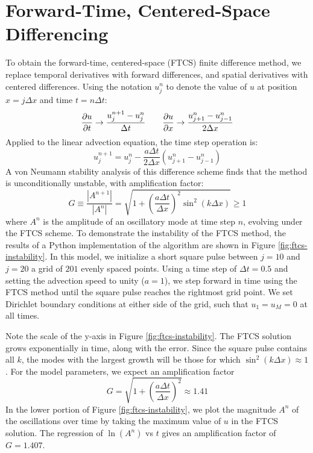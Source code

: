 \documentclass[%
 reprint,
 amsmath,amssymb,
 aps,
]{revtex4-2}
\begin{document}
\section{Forward-Time, Centered-Space Differencing}

To obtain the forward-time, centered-space (FTCS) finite difference method, we replace temporal derivatives with forward differences, and spatial derivatives with centered differences. Using the notation $u_j^n$ to denote the value of $u$ at position $x = j\Delta x$ and time $t = n\Delta t$:
\begin{equation}
\pdv{u}{t} \rightarrow \frac{u_j ^{n+1} - u_j ^n}{\Delta t} \qquad \pdv{u}{x} \rightarrow \frac{u_{j+1} ^n - u_{j-1} ^n}{2 \Delta x}
\end{equation}
Applied to the linear advection equation, the time step operation is:
\begin{equation}
u_j ^{n+1} = u_j ^n - \frac{a \Delta t}{2 \Delta x} \left(u_{j+1} ^n - u_{j-1} ^n\right)
\end{equation}
A von Neumann stability analysis of this difference scheme finds that the method is unconditionally unstable, with amplification factor:
\begin{equation}
G \equiv \frac{|A^{n+1}|}{|A^n|} = \sqrt{1 + \left( \frac{ a \Delta t}{\Delta x} \right)^2 \sin ^2 (k \Delta x)} \geq 1
\end{equation}
where $A^n$ is the amplitude of an oscillatory mode at time step $n$, evolving under the FTCS scheme. To demonstrate the instability of the FTCS method, the results of a Python implementation of the algorithm are shown in Figure \ref{fig:ftcs-instability}. In this model, we initialize a short square pulse between $j=10$ and $j=20$ a grid of $201$ evenly spaced points. Using a time step of $\Delta t = 0.5$ and setting the advection speed to unity ($a = 1$), we step forward in time using the FTCS method until the square pulse reaches the rightmost grid point. We set Dirichlet boundary conditions at either side of the grid, such that $u_1 = u_M = 0$ at all times.

Note the scale of the y-axis in Figure \ref{fig:ftcs-instability}. The FTCS solution grows exponentially in time, along with the error. Since the square pulse contains all $k$, the modes with the largest growth will be those for which $\sin^2(k \Delta x) \approx 1$. For the model parameters, we expect an amplification factor
\begin{equation}
G = \sqrt{1 + \left( \frac{ a \Delta t}{\Delta x} \right)^2} \approx 1.41
\end{equation}
In the lower portion of Figure \ref{fig:ftcs-instability}, we plot the magnitude $A^n$ of the oscillations over time by taking the maximum value of $u$ in the FTCS solution. The regression of $\ln(A^n)$ vs $t$ gives an amplification factor of $G = 1.407$.
\end{document}
